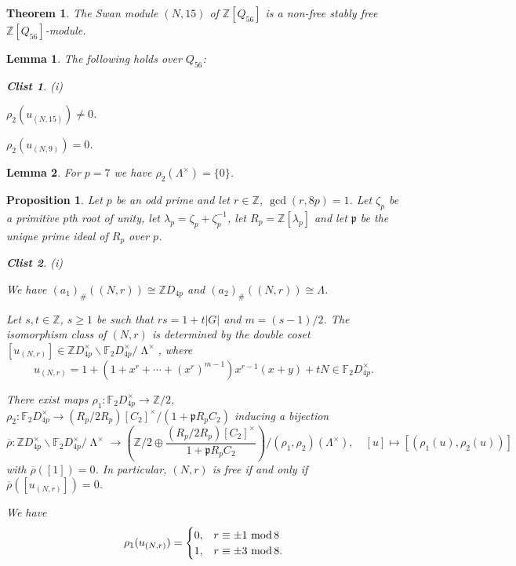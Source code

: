\documentclass[10pt,a4paper]{amsart}
\newtheorem{prop}{Proposition}
\newtheorem{clist}{Clist}
\newtheorem{thm}{Theorem}
\newtheorem{lemma}{Lemma}
\newcommand{\F}{\mathbb{F}}
\DeclareMathOperator{\LL}{\Lambda}
\newcommand{\Z}{\mathbb{Z}}
\renewcommand{\mod}{\,\,\text{\normalfont mod}\,}
\begin{document}
\begin{thm}\label{cor:N15}
The Swan module $(N, 15)$ of $\Z[Q_{56}]$ is a non-free stably free $\Z[Q_{56}]$-module.
\end{thm}

\begin{lemma}\label{lemma:rho2u}
The following holds over $Q_{56}$:
\begin{clist}{(i)}
    \item
        $\rho_2(u_{(N, 15)}) \neq 0$.
    \item
        $\rho_2(u_{(N, 9)}) = 0$.
\end{clist}
\end{lemma}

\begin{lemma}\label{lemma:rho2units}
  For $p = 7$ we have $\rho_2(\Lambda^\times) = \{0\}$.
\end{lemma}

\begin{prop}\label{prop:swansetup}
Let $p$ be an odd prime and let $r \in \Z$, $\gcd(r, 8p) = 1$.
Let $\zeta_p$ be a primitive $p$th root of unity, let $\lambda_p = \zeta_p+\zeta_p^{-1}$, let $R_p = \Z[\lambda_p]$ and let $\mathfrak p$ be the unique prime ideal of $R_p$ over $p$.
\begin{clist}{(i)}
\item
    We have $(a_1)_\#((N, r)) \cong \Z D_{4p}$ and $(a_2)_\#((N, r)) \cong \Lambda$.
\item
Let $s,t \in \Z$, $s \geq 1$ be such that $rs = 1+t|G|$ and $m = (s-1)/2$. The isomorphism class of $(N, r)$ is determined by the double coset $[u_{(N, r)}] \in \Z D_{4p}^\times \backslash \F_2 D_{4p}^\times /{\LL^\times}$, where
\[ u_{(N,r)} = 1+(1+x^r + \dotsb +  (x^r)^{m-1})x^{r-1}(x+y) + tN \in \F_2 D_{4p}^\times. \]
\item
There exist maps $\rho_1 \colon \F_2 D_{4p}^\times \to \Z/2$, $\rho_2 \colon \F_2 D_{4p}^\times \to (R_p/2R_p)[C_2]^\times/(1 + \mathfrak p R_p C_2)$ inducing a bijection
\[
\overline \rho \colon \Z D_{4p}^\times \backslash \F_2 D_{4p}^\times /{\LL^\times}
\longrightarrow \left(\Z/2 \oplus \frac{(R_p/2R_p)[C_2]^\times}{1+\mathfrak{p}R_pC_2}\right) \Big/ (\rho_1, \rho_2)(\Lambda^\times), \quad [u] \mapsto [(\rho_1(u),\rho_2(u))]
\] 
with $\overline \rho([1]) = 0$.
In particular, $(N, r)$ is free if and only if $\overline \rho([u_{(N, r)}]) = 0$.
\item
We have
\[ \rho_1(u_{(N,r)}) = 
\begin{cases}
0, & r \equiv \pm 1 \mod 8 \\
1, & r \equiv \pm 3 \mod 8. 
\end{cases}
\]
\end{clist}
\end{prop}
\end{document}
